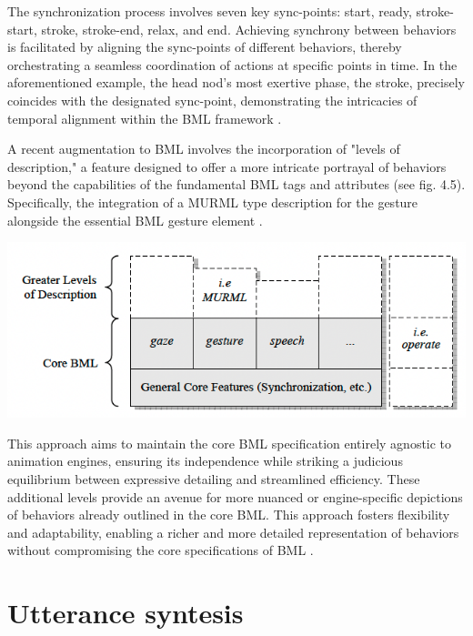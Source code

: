 The synchronization process involves seven key sync-points: start, ready, stroke-start, stroke, stroke-end, relax, and end. Achieving synchrony between behaviors is facilitated by aligning the sync-points of different behaviors, thereby orchestrating a seamless coordination of actions at specific points in time. In the aforementioned example, the head nod's most exertive phase, the stroke, precisely coincides with the designated sync-point, demonstrating the intricacies of temporal alignment within the BML framework \parencite{vilhjalmsson2007behavior}.

A recent augmentation to BML involves the incorporation of "levels of description," a feature designed to offer a more intricate portrayal of behaviors beyond the capabilities of the fundamental BML tags and attributes (see fig. 4.5). Specifically, the integration of a MURML type description for the gesture alongside the essential BML gesture element \parencite{vilhjalmsson2007behavior}.


\includegraphics[width=\textwidth]{figures/bml.png}

This approach aims to maintain the core BML specification entirely agnostic to animation engines, ensuring its independence while striking a judicious equilibrium between expressive detailing and streamlined efficiency. These additional levels provide an avenue for more nuanced or engine-specific depictions of behaviors already outlined in the core BML. This approach fosters flexibility and adaptability, enabling a richer and more detailed representation of behaviors without compromising the core specifications of BML \parencite{vilhjalmsson2007behavior}.




\section{Utterance syntesis}


